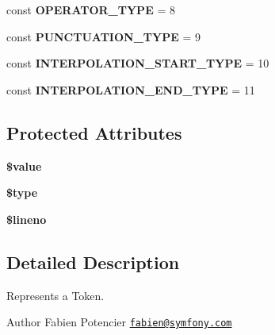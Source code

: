 \begin{DoxyCompactItemize}
\item 
const {\bfseries O\+P\+E\+R\+A\+T\+O\+R\+\_\+\+T\+Y\+PE} = 8\hypertarget{classTwig__Token_afe870236558a22eb559fb192ba713b8d}{}\label{classTwig__Token_afe870236558a22eb559fb192ba713b8d}

\item 
const {\bfseries P\+U\+N\+C\+T\+U\+A\+T\+I\+O\+N\+\_\+\+T\+Y\+PE} = 9\hypertarget{classTwig__Token_ae50619f4adb6c00615934687f0a009ec}{}\label{classTwig__Token_ae50619f4adb6c00615934687f0a009ec}

\item 
const {\bfseries I\+N\+T\+E\+R\+P\+O\+L\+A\+T\+I\+O\+N\+\_\+\+S\+T\+A\+R\+T\+\_\+\+T\+Y\+PE} = 10\hypertarget{classTwig__Token_a06c90170a0c9699439b7f88bf71eb97c}{}\label{classTwig__Token_a06c90170a0c9699439b7f88bf71eb97c}

\item 
const {\bfseries I\+N\+T\+E\+R\+P\+O\+L\+A\+T\+I\+O\+N\+\_\+\+E\+N\+D\+\_\+\+T\+Y\+PE} = 11\hypertarget{classTwig__Token_a871ddc00628ac0b3d4b12ad31adcb98c}{}\label{classTwig__Token_a871ddc00628ac0b3d4b12ad31adcb98c}

\end{DoxyCompactItemize}
\subsection*{Protected Attributes}
\begin{DoxyCompactItemize}
\item 
{\bfseries \$value}\hypertarget{classTwig__Token_aff56a45fb55415e4fa34be7f57a308ac}{}\label{classTwig__Token_aff56a45fb55415e4fa34be7f57a308ac}

\item 
{\bfseries \$type}\hypertarget{classTwig__Token_a50299c332af2e31f7ab82ddb558046dd}{}\label{classTwig__Token_a50299c332af2e31f7ab82ddb558046dd}

\item 
{\bfseries \$lineno}\hypertarget{classTwig__Token_a3c0629f245b1683d6504da7bf7160393}{}\label{classTwig__Token_a3c0629f245b1683d6504da7bf7160393}

\end{DoxyCompactItemize}


\subsection{Detailed Description}
Represents a Token.

\begin{DoxyAuthor}{Author}
Fabien Potencier \href{mailto:fabien@symfony.com}{\tt fabien@symfony.\+com} 
\end{DoxyAuthor}


